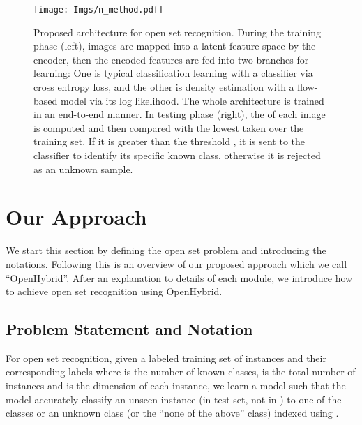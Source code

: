 \documentclass[runningheads]{llncs}
\begin{document}
\begin{figure}[!tb]
\centering
	\texttt{[image: Imgs/n\_method.pdf]}
 	\caption{ Proposed architecture for open set recognition. During the training phase (left), images are mapped into a latent feature space by the encoder, then the encoded features are fed into two branches for learning: One is typical classification learning with a classifier via cross entropy loss, and the other is density estimation with a flow-based model via its log likelihood. The whole architecture is trained in an end-to-end manner. In testing phase (right),  the  of each image is computed and then compared with the lowest  taken over the training set. If it is greater than the threshold , it is sent to the classifier to identify its specific known class, otherwise it is rejected as an unknown sample.
 	}
	\label{method}
\end{figure}


\section{Our Approach}
We start this section by defining the open set problem and introducing the notations. Following this is an overview of our proposed approach which we call ``OpenHybrid''. After an explanation to details of each module, we introduce how to achieve open set recognition using OpenHybrid.  

\subsection{Problem Statement and Notation}
For open set recognition, given a labeled training set of instances  and their corresponding labels  where  is the number of known classes,  is the total number of instances and  is the dimension of each instance, we learn a model  such that the model accurately classify an unseen instance (in test set, not in ) to one of the  classes or an unknown class (or the ``none of the above'' class) indexed using .
\end{document}

